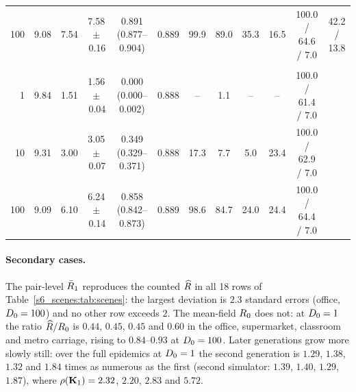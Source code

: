 \begin{table}[tbp]
\begin{tabular}{@{}rccccccccccc@{}}
100 & 9.08 & 7.54 & 7.58\,$\pm$\,0.16 & 0.891 (0.877--0.904) & 0.889 & 99.9 & 89.0 & 35.3 & 16.5 & 100.0 / 64.6 / 7.0 & 42.2 / 13.8\\
\addlinespace
\multicolumn{12}{@{}l}{\emph{Metro carriage}, $\Npop=310$, $\ncell=270$, same-cell kernel; $\beta\langle q\rangle/\gamma=9.06$, $\beta\qmax/\gamma=10.00$}\\
1 & 9.84 & 1.51 & 1.56\,$\pm$\,0.04 & 0.000 (0.000--0.002) & 0.888 & -- & 1.1 & -- & -- & 100.0 / 61.4 / 7.0 & \\
10 & 9.31 & 3.00 & 3.05\,$\pm$\,0.07 & 0.349 (0.329--0.371) & 0.888 & 17.3 & 7.7 & 5.0 & 23.4 & 100.0 / 62.9 / 7.0 & \\
100 & 9.09 & 6.10 & 6.24\,$\pm$\,0.14 & 0.858 (0.842--0.873) & 0.889 & 98.6 & 84.7 & 24.0 & 24.4 & 100.0 / 64.4 / 7.0 & \\
\bottomrule
\end{tabular}
\end{table}

\paragraph{Secondary cases.} The pair-level $\bar{R}_1$ reproduces the counted $\widehat{R}$ in all 18 rows of
Table~\ref{s6_scenes:tab:scenes}: the largest deviation is $2.3$ standard errors (office, $D_0=100$) and no
other row exceeds $2$. The mean-field $R_0$ does not: at $D_0=1$ the ratio $\widehat{R}/R_0$ is $0.44$, $0.45$,
$0.45$ and $0.60$ in the office, supermarket, classroom and metro carriage, rising to $0.84$--$0.93$ at
$D_0=100$. Later generations grow more slowly still: over the full epidemics at $D_0=1$ the second generation
is $1.29$, $1.38$, $1.32$ and $1.84$ times as numerous as the first (second simulator: $1.39$, $1.40$, $1.29$,
$1.87$), where $\rho(\mathbf{K}_1)=2.32$, $2.20$, $2.83$ and $5.72$.

